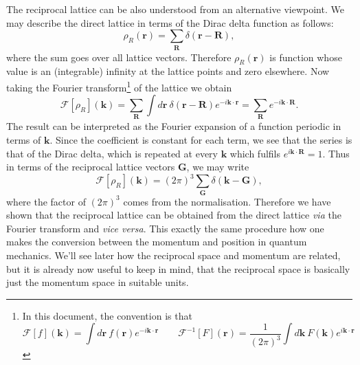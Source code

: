 The reciprocal lattice can be also understood from an alternative viewpoint. We may describe the direct lattice in terms of the Dirac delta function as follows:
\begin{equation}
\rho_R(\mathbf{r}) = \sum_{\mathbf{R}} \delta(\mathbf{r}-\mathbf{R}), 
\end{equation}
where the sum goes over all lattice vectors. Therefore $\rho_R(\mathbf{r})$ is function whose value is an (integrable) infinity at the lattice points and zero elsewhere. 
Now taking the Fourier transform\footnote{In this document, the convention is that 
$$
\mathcal{F}[f](\mathbf{k})  =  \int d \mathbf{r}\ f(\mathbf{r}) e^{-i\mathbf{k}\cdot \mathbf{r}} \qquad
\mathcal{F}^{-1}[F](\mathbf{r})  = \frac{1}{(2\pi)^3} \int d \mathbf{k} \ F(\mathbf{k}) e^{i\mathbf{k}\cdot \mathbf{r}}
$$} of the lattice we obtain
\begin{equation}
\mathcal{F}[\rho_R](\mathbf{k}) = 
 \sum_{\mathbf{R}} \int d \mathbf{r}\ \delta(\mathbf{r}-\mathbf{R}) e^{-i\mathbf{k}\cdot \mathbf{r}} = \sum_{\mathbf{R}}
 e^{-i\mathbf{k}\cdot \mathbf{R}}.
\end{equation}
The result can be interpreted as the Fourier expansion of a function periodic in terms of $\mathbf{k}$. Since the coefficient is constant for each term, we see that the series is that of the Dirac delta, which is repeated at every $\mathbf{k}$ which fulfils $e^{i\mathbf{k}\cdot\mathbf{R}} = 1$. Thus in terms of the reciprocal lattice vectors $\mathbf{G}$, we may write
\begin{equation}
\mathcal{F}[\rho_R](\mathbf{k}) = (2\pi)^3 \sum_{\mathbf{G}} \delta(\mathbf{k} - \mathbf{G}),
\end{equation}
where the factor of $(2\pi)^3$ comes from the normalisation. Therefore we have shown that the reciprocal lattice can be obtained from the direct lattice \emph{via} the Fourier transform and \emph{vice versa}. This exactly the same procedure how one makes the conversion between the momentum and position in quantum mechanics. We'll see later how the reciprocal space and momentum are related, but it is already now useful to keep in mind, that the reciprocal space is basically just the momentum space in suitable units.

